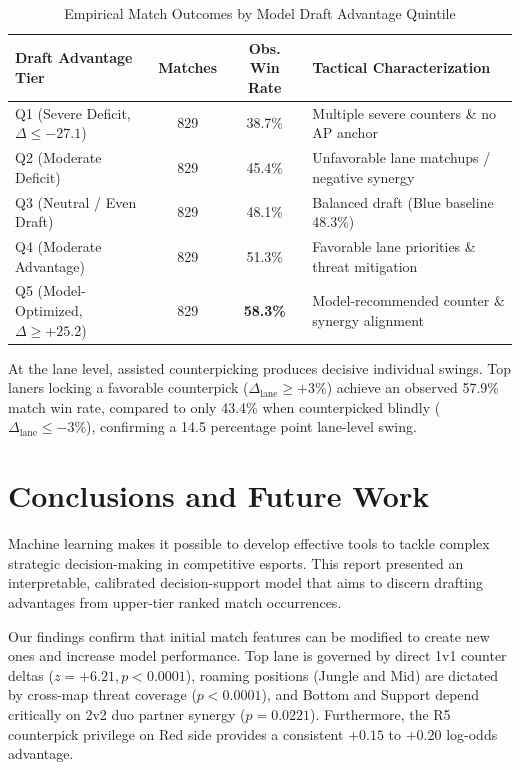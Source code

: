 \documentclass[11pt,letterpaper]{article}
\begin{document}
\vspace{-0.5em}
\begin{table}[H]
\centering
\caption{Empirical Match Outcomes by Model Draft Advantage Quintile}
\label{tab:quintiles}
\footnotesize
\setlength{\tabcolsep}{5pt}
\begin{tabular}{lccl}
\toprule
\textbf{Draft Advantage Tier} & \textbf{Matches} & \textbf{Obs. Win Rate} & \textbf{Tactical Characterization} \\
\midrule
Q1 (Severe Deficit, $\Delta \le -27.1$) & 829 & 38.7\% & Multiple severe counters \& no AP anchor \\
Q2 (Moderate Deficit) & 829 & 45.4\% & Unfavorable lane matchups / negative synergy \\
Q3 (Neutral / Even Draft) & 829 & 48.1\% & Balanced draft (Blue baseline 48.3\%) \\
Q4 (Moderate Advantage) & 829 & 51.3\% & Favorable lane priorities \& threat mitigation \\
Q5 (Model-Optimized, $\Delta \ge +25.2$) & 829 & \textbf{58.3\%} & Model-recommended counter \& synergy alignment \\
\bottomrule
\end{tabular}
\end{table}
\vspace{-0.6em}

At the lane level, assisted counterpicking produces decisive individual swings. Top laners locking a favorable counterpick ($\Delta_{\text{lane}} \ge +3\%$) achieve an observed 57.9\% match win rate, compared to only 43.4\% when counterpicked blindly ($\Delta_{\text{lane}} \le -3\%$), confirming a 14.5 percentage point lane-level swing.

\section{Conclusions and Future Work}

Machine learning makes it possible to develop effective tools to tackle complex strategic decision-making in competitive esports. This report presented an interpretable, calibrated decision-support model that aims to discern drafting advantages from upper-tier ranked match occurrences.

Our findings confirm that initial match features can be modified to create new ones and increase model performance. Top lane is governed by direct 1v1 counter deltas ($z = +6.21, p < 0.0001$), roaming positions (Jungle and Mid) are dictated by cross-map threat coverage ($p < 0.0001$), and Bottom and Support depend critically on 2v2 duo partner synergy ($p = 0.0221$). Furthermore, the R5 counterpick privilege on Red side provides a consistent $+0.15$ to $+0.20$ log-odds advantage. 
\end{document}
